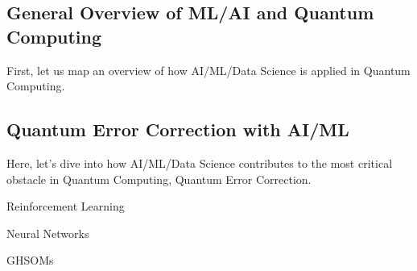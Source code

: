 \subsection{General Overview of ML/AI and Quantum Computing}

\label{sec:aimlquantumo}

\cite{alexeev2024artificialintelligencequantumcomputing}
\cite{wang2024artificialintelligencequantumerror}
\cite{KITAEV20032}
First, let us map an overview of how AI/ML/Data Science is applied in Quantum Computing.


\subsection{Quantum Error Correction with AI/ML}
Here, let's dive into how AI/ML/Data Science contributes to the most critical obstacle in Quantum Computing, Quantum Error Correction.

Reinforcement Learning
\cite{PhysRevX.8.031084}
\cite{Sweke_2021}

Neural Networks
\cite{Baireuther_2019}
\cite{Varsamopoulos_2018}
\cite{SwekeKesselringVanNieuwenburgEisert2021}

GHSOMs
\cite{MALONDKAR2019572}
\cite{5640262}


